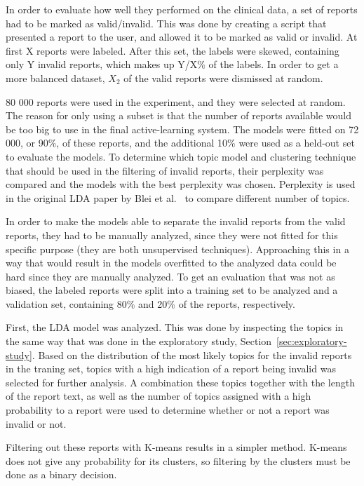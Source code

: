 In order to evaluate how well they performed on the clinical data, a set of reports had to be marked as valid/invalid.
This was done by creating a script that presented a report to the user, and allowed it to be marked as valid or invalid.
At first X reports were labeled.
After this set, the labels were skewed, containing only Y invalid reports, which makes up Y/X\% of the labels.
In order to get a more balanced dataset, $X_2$ of the valid reports were dismissed at random.

80 000 reports were used in the experiment, and they were selected at random.
The reason for only using a subset is that the number of reports available would be too big to use in the final active-learning system. %
The models were fitted on 72 000, or 90\%, of these reports, and the additional 10\% were used as a held-out set to evaluate the models.
To determine which topic model and clustering technique that should be used in the filtering of invalid reports, their perplexity was compared and the models with the best perplexity was chosen.
Perplexity is used in the original LDA paper by Blei et al\@.~\cite{blei2003latent} to compare different number of topics.

In order to make the models able to separate the invalid reports from the valid reports, they had to be manually analyzed, since they were not fitted for this specific purpose (they are both unsupervised techniques).
Approaching this in a way that would result in the models overfitted to the analyzed data could be hard since they are manually analyzed. 
To get an evaluation that was not as biased, the labeled reports were split into a training set to be analyzed and a validation set, containing 80\% and 20\% of the reports, respectively.

First, the LDA model was analyzed.
This was done by inspecting the topics in the same way that was done in the exploratory study, Section~\ref{sec:exploratory-study}.
Based on the distribution of the most likely topics for the invalid reports in the traning set, topics with a high indication of a report being invalid was selected for further analysis.
A combination these topics together with the length of the report text, as well as the number of topics assigned with a high probability to a report were used to determine whether or not a report was invalid or not.

Filtering out these reports with K-means results in a simpler method.
K-means does not give any probability for its clusters, so filtering by the clusters must be done as a binary decision.

